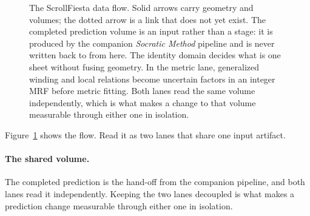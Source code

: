 \begin{figure}[t]
{}
  \caption{The ScrollFiesta data flow. Solid arrows carry geometry and volumes;
  the dotted arrow is a link that does not yet exist. The completed prediction
  volume is an input rather than a stage: it is produced by the companion
  \emph{Socratic Method} pipeline and is never written back to from here. The
  identity domain decides what is one sheet without fusing geometry. In the
  metric lane, generalized winding and local relations become uncertain factors
  in an integer MRF before metric fitting. Both lanes read the same volume
  independently, which is what makes a change to that volume measurable through
  either one in isolation.}
  \label{fig:dataflow}
\end{figure}

Figure~\ref{fig:dataflow} shows the flow. Read it as two lanes that share one input artifact.

\paragraph{The shared volume.} The completed prediction is the hand-off from the companion pipeline, and both lanes read it independently. Keeping the two lanes decoupled is what makes a prediction change measurable through either one in isolation.


